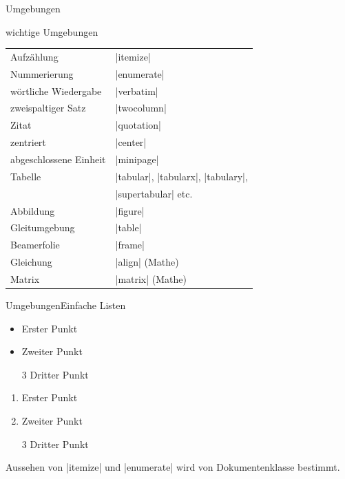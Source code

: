\documentclass[
	vorläufig=true,
	datum=2016-10-28,
	titel={Allgemeine Formatierung und Pakete},
	web=true,
]{../tex/latexkurs-slides}
\begin{document}
\begin{frame}[fragile]{Umgebungen}
\begin{block}{wichtige Umgebungen}
\begin{tabular}{ll}
Aufzählung & |itemize| \\
Nummerierung & |enumerate| \\
wörtliche Wiedergabe & |verbatim| \\
zweispaltiger Satz & |twocolumn|\\
Zitat & |quotation| \\
zentriert & |center|\\
abgeschlossene Einheit & |minipage|\\
Tabelle & |tabular|, |tabularx|, |tabulary|,\\
         & |supertabular| etc. \\
Abbildung & |figure| \\
Gleitumgebung & |table| \\
Beamerfolie & |frame| \\
Gleichung & |align| (Mathe)\\
Matrix & |matrix| (Mathe)\\
\end{tabular}
\end{block}
\end{frame}

\begin{frame}[fragile]{Umgebungen}{Einfache Listen}
\begin{LTXexample}
\begin{itemize}
  \item Erster Punkt
  \item Zweiter Punkt
  \item[3] Dritter Punkt
\end{itemize}
\end{LTXexample}
\begin{LTXexample}
\begin{enumerate}
  \item Erster Punkt
  \item Zweiter Punkt
  \item[3] Dritter Punkt
\end{enumerate}
\end{LTXexample}
Aussehen von |itemize| und |enumerate| wird von Dokumentenklasse bestimmt.
\end{frame}
\end{document}
